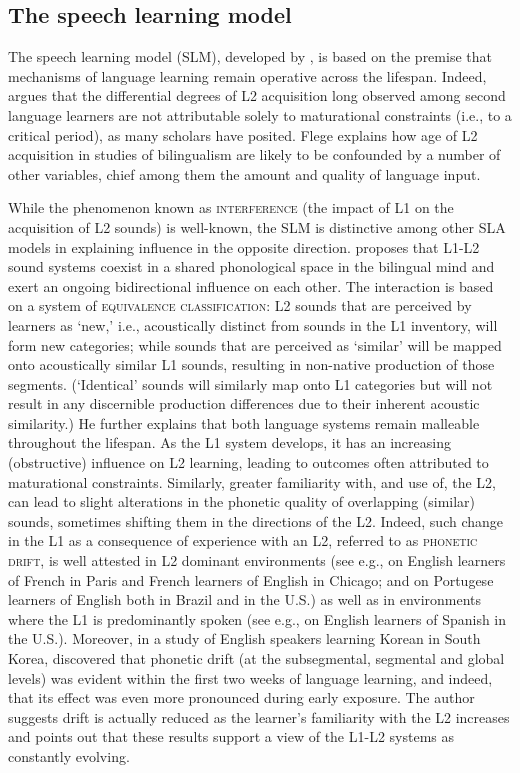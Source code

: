 \documentclass[output=paper]{langsci/langscibook}
\begin{document}
 
\subsection{The speech learning model}
\label{sec:nove:3.2}


The speech learning model (SLM), developed by \citet{Flege1995, Flege1996}, is based on the premise that mechanisms of language learning remain operative across the lifespan. Indeed, \citet{Flege2007} argues that the differential degrees of L2 acquisition long observed among second language learners are not attributable solely to maturational constraints (i.e., to a critical period), as many scholars have posited. Flege explains how age of L2 acquisition in studies of bilingualism are likely to be confounded by a number of other variables, chief among them the amount and quality of language input. 

While the phenomenon known as \textsc{interference} (the impact of L1 on the acquisition of L2 sounds) is well-known, the SLM is distinctive among other SLA models in explaining influence in the opposite direction. \citet{Flege1995, Flege1996} proposes that L1-L2 sound systems coexist in a shared phonological space in the bilingual mind and exert an ongoing bidirectional influence on each other. The interaction is based on a system of \textsc{equivalence} \textsc{classification}: L2 sounds that are perceived by learners as ‘new,’ i.e., acoustically distinct from sounds in the L1 inventory, will form new categories; while sounds that are perceived as ‘similar’ will be mapped onto acoustically similar L1 sounds, resulting in non-native production of those segments. (‘Identical’ sounds will similarly map onto L1 categories but will not result in any discernible production differences due to their inherent acoustic similarity.) He further explains that both language systems remain malleable throughout the lifespan. As the L1 system develops, it has an increasing (obstructive) influence on L2 learning, leading to outcomes often attributed to maturational constraints. Similarly, greater familiarity with, and use of, the L2, can lead to slight alterations in the phonetic quality of overlapping (similar) sounds, sometimes shifting them in the directions of the L2. Indeed, such change in the L1 as a consequence of experience with an L2, referred to as \textsc{phonetic} \textsc{drift,} is well attested in L2 dominant environments (see e.g., \citealt{Flege1987} on English learners of French in Paris and French learners of English in Chicago; and \citealt{SancierFowler1997} on Portugese learners of English both in Brazil and in the U.S.) as well as in environments where the L1 is predominantly spoken (see e.g., \citet{HerdEtAl2015} on English learners of Spanish in the U.S.). Moreover, in a study of English speakers learning Korean in South Korea, \citet{Chang2012, Chang2013} discovered that phonetic drift (at the subsegmental, segmental and global levels) was evident within the first two weeks of language learning, and indeed, that its effect was even more pronounced during early exposure. The author suggests drift is actually reduced as the learner’s familiarity with the L2 increases and points out that these results support a view of the L1-L2 systems as constantly evolving.  
\end{document}
